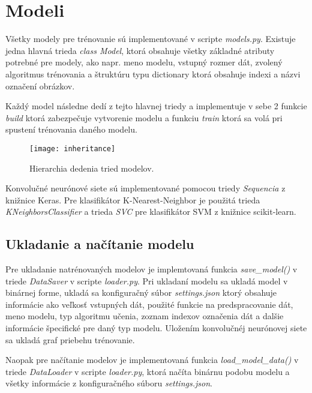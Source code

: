 
\section{Modeli}
\label{sec:modely}
Všetky modely pre trénovanie sú implementované v scripte \textit{models.py}.
Existuje jedna hlavná trieda \textit{class Model}, ktorá obsahuje všetky základné atributy potrebné pre modely, ako napr.
    meno modelu, vstupný rozmer dát, zvolený algoritmus trénovania a štruktúru typu dictionary ktorá obsahuje indexi a názvi označení obrázkov.

Každý model následne dedí z tejto hlavnej triedy a implementuje v sebe 2 funkcie \textit{build} ktorá zabezpečuje vytvorenie modelu a
    funkciu \textit{train} ktorá sa volá pri spustení trénovania daného modelu.

\begin{figure}[H]
    \centering
    \texttt{[image: inheritance]}
    \caption{Hierarchia dedenia tried modelov.}
    \label{pic:inheritance}
\end{figure}

Konvolučné neurónové siete sú implementované pomocou triedy \textit{Sequencia} z knižnice Keras.
Pre klasifikátor K-Nearest-Neighbor je použitá trieda \textit{KNeighborsClassifier} a trieda \textit{SVC} pre klasifikátor SVM z knižnice scikit-learn.

\subsection{Ukladanie a načítanie modelu}
\label{subsec:ukladaniemodelu}
Pre ukladanie natrénovaných modelov je implemtovaná funkcia \textit{save\_model()} v triede \textit{DataSaver} v scripte \textit{loader.py}.
Pri ukladaní modelu sa ukladá model v binárnej forme, ukladá sa konfiguračný súbor \textit{settings.json} ktorý obsahuje informácie ako veľkosť
    vstupných dát, použité funkcie na predspracovanie dát, meno modelu, typ algoritmu učenia, zoznam indexov označenia dát a dalšie informácie
    špecifické pre daný typ modelu.
Uložením konvolučnéj neurónovej siete sa ukladá graf priebehu trénovanie.

Naopak pre načítanie modelov je implementovaná funkcia \textit{load\_model\_data()} v triede \textit{DataLoader} v scripte \textit{loader.py},
    ktorá načíta binárnu podobu modelu a všetky informácie z konfiguračného súboru \textit{settings.json}.
